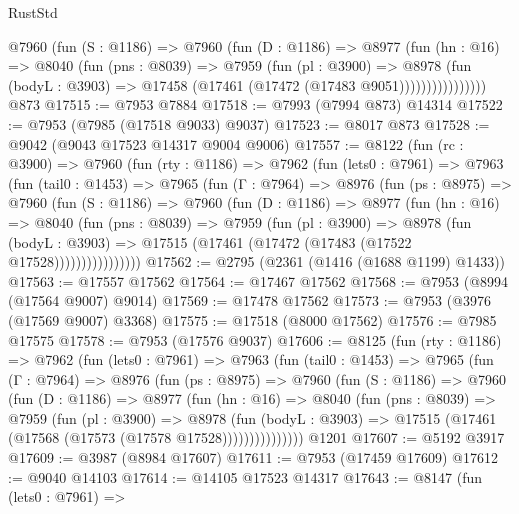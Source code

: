 \begin{lexlean}{RustStd}
\begin{coremodule}
                @7960
                  (fun (S : @1186) =>
                  @7960
                    (fun (D : @1186) =>
                    @8977
                      (fun (hn : @16) =>
                      @8040
                        (fun (pns : @8039) =>
                        @7959
                          (fun (pl : @3900) =>
                          @8978
                            (fun (bodyL : @3903) =>
                            @17458 (@17461 (@17472 (@17483 @9051))))))))))))))))
    @873
@17515 := @7953 @7884
@17518 := @7993 (@7994 @873) @14314
@17522 := @7953 (@7985 (@17518 @9033) @9037)
@17523 := @8017 @873
@17528 := @9042 (@9043 @17523 @14317 @9004 @9006)
@17557 := @8122
    (fun (rc : @3900) =>
    @7960
      (fun (rty : @1186) =>
      @7962
        (fun (lets0 : @7961) =>
        @7963
          (fun (tail0 : @1453) =>
          @7965
            (fun (Γ : @7964) =>
            @8976
              (fun (ps : @8975) =>
              @7960
                (fun (S : @1186) =>
                @7960
                  (fun (D : @1186) =>
                  @8977
                    (fun (hn : @16) =>
                    @8040
                      (fun (pns : @8039) =>
                      @7959
                        (fun (pl : @3900) =>
                        @8978
                          (fun (bodyL : @3903) =>
                          @17515 (@17461 (@17472 (@17483 (@17522 @17528))))))))))))))))
@17562 := @2795 (@2361 (@1416 (@1688 @1199) @1433))
@17563 := @17557 @17562
@17564 := @17467 @17562
@17568 := @7953 (@8994 (@17564 @9007) @9014)
@17569 := @17478 @17562
@17573 := @7953 (@3976 (@17569 @9007) @3368)
@17575 := @17518 (@8000 @17562)
@17576 := @7985 @17575
@17578 := @7953 (@17576 @9037)
@17606 := @8125
    (fun (rty : @1186) =>
    @7962
      (fun (lets0 : @7961) =>
      @7963
        (fun (tail0 : @1453) =>
        @7965
          (fun (Γ : @7964) =>
          @8976
            (fun (ps : @8975) =>
            @7960
              (fun (S : @1186) =>
              @7960
                (fun (D : @1186) =>
                @8977
                  (fun (hn : @16) =>
                  @8040
                    (fun (pns : @8039) =>
                    @7959
                      (fun (pl : @3900) =>
                      @8978
                        (fun (bodyL : @3903) =>
                        @17515 (@17461 (@17568 (@17573 (@17578 @17528)))))))))))))))
    @1201
@17607 := @5192 @3917
@17609 := @3987 (@8984 @17607)
@17611 := @7953 (@17459 @17609)
@17612 := @9040 @14103
@17614 := @14105 @17523 @14317
@17643 := @8147
    (fun (lets0 : @7961) =>

\end{coremodule}
\end{lexlean}
